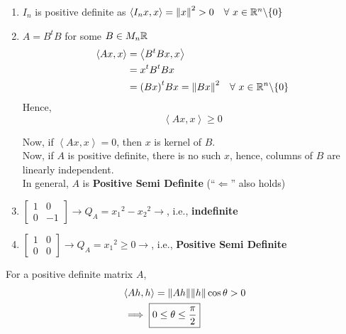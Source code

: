 \documentclass[../Analysis-3]{subfiles}
\begin{document}
\begin{Eg}{}{}
    \begin{enumerate}
        \item  $I_n$ is positive definite as $\left\langle I_nx, x \right\rangle = {\|x \|}^2 > 0 \quad \forall\ x \in \mathbb{R}^n \backslash \{0\}$
        \item $A = B^tB$ for some $B \in M_n{\mathbb{R}}$
              \begin{align*}
                  \left\langle Ax,x \right\rangle & = \left\langle B^tBx,x \right\rangle                                    \\
                                                  & = x^tB^tBx                                                              \\
                                                  & = {(Bx)}^t Bx = {\| Bx \|}^2 \quad \forall\ x \in \mathbb{R}^n \backslash \{0\}
              \end{align*}
              Hence, \[ \left\langle Ax,x \right\rangle \geq 0 \]

              Now, if $ \left\langle Ax,x \right\rangle = 0 $, then  $x$ is kernel of $B$. \\
              Now, if $A$ is positive definite, there is no such $x$, hence, columns of $B$ are linearly independent. \\
              In general, $A$ is \textbf{Positive Semi Definite} (``$\Longleftarrow$'' also holds)

        \item $\begin{bmatrix}
                      1 & 0  \\
                      0 & -1
                  \end{bmatrix} \longrightarrow Q_A = {x_1}^2 - {x_2}^2 \longrightarrow $, i.e., \textbf{indefinite}
        \item  $\begin{bmatrix}
                      1 & 0 \\
                      0 & 0
                  \end{bmatrix} \longrightarrow Q_A = {x_1}^2 \geq 0 \longrightarrow $, i.e., \textbf{Positive Semi Definite}

    \end{enumerate}
\end{Eg}

For a positive definite matrix $ A $,
\begin{align*}
     & \left\langle Ah, h \right\rangle = \norm{Ah}\norm{h}\cos{\theta} > 0 \\
     & \implies \boxed{0 \leq \theta \leq \frac{\pi}{2}}
\end{align*}
\end{document}
